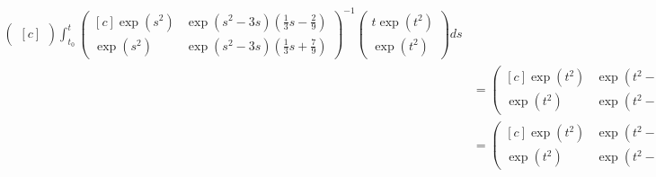 \begin{solution}
\begin{align*}
\begin{pmatrix*}[c]
  \end{pmatrix*}
  \int_{t_0}^{t}  \begin{pmatrix*}[c]
      \exp(s^2) & \exp(s^2-3s)(\frac{1}{3}s - \frac{2}{9}) \\
      \exp(s^2) & \exp(s^2-3s)(\frac{1}{3}s + \frac{7}{9})
    \end{pmatrix*}^{-1}
    \begin{pmatrix}
      t\exp(t^2) \\ \exp(t^2)
    \end{pmatrix}ds \\
    &= \begin{pmatrix*}[c]
      \exp(t^2) & \exp(t^2-3t)(\frac{1}{3}t - \frac{2}{9}) \\
      \exp(t^2) & \exp(t^2-3t)(\frac{1}{3}t + \frac{7}{9})
    \end{pmatrix*}
    \left(  \begin{pmatrix*}[c]
        y_0^1\exp(t_0^2) + y_0^2\exp(t_0^2-3t)(\frac{1}{3}t_0 - \frac{2}{9}) \\
        y_0^1\exp(t_0^2) + y_0^2\exp(t_0^2-3t)(\frac{1}{3}t_0 + \frac{7}{9})
      \end{pmatrix*} +
    \int_{t_0}^{t}  \begin{pmatrix*}[c]
        \frac{3s + 7}{9\exp(s^2)} &\frac{-3s + 2}{9\exp(s^2)} \\
        \frac{-\exp(3s)}{\exp(s^2)} & \frac{\exp(3s)}{\exp(s^2)})
      \end{pmatrix*}
      \begin{pmatrix}
        s\exp(s^2) \\ \exp(s^2)
      \end{pmatrix}ds \right)\\
      &= \begin{pmatrix*}[c]
        \exp(t^2) & \exp(t^2-3t)(\frac{1}{3}t - \frac{2}{9}) \\
        \exp(t^2) & \exp(t^2-3t)(\frac{1}{3}t + \frac{7}{9})
      \end{pmatrix*}
      \left(\begin{pmatrix*}[c]
          y_0^1\exp(t_0^2) + y_0^2\exp(t_0^2-3t)(\frac{1}{3}t_0 - \frac{2}{9}) \\
          y_0^1\exp(t_0^2) + y_0^2\exp(t_0^2-3t)(\frac{1}{3}t_0 + \frac{7}{9})
        \end{pmatrix*} +
      \int_{t_0}^{t}  \begin{pmatrix*}[c]
          \frac{3s^2 + 4s + 2}{9} \\
          \exp(3s)(1 - s)
        \end{pmatrix*}ds \right)\\

\end{align*}
\end{solution}
